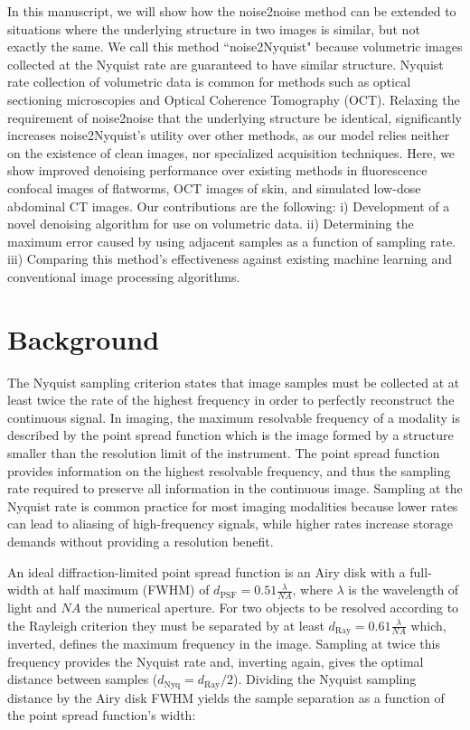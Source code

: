 \documentclass[journal,twoside,web]{ieeecolor}
\begin{document}
In this manuscript, we will show how the noise2noise method can be extended to situations where the underlying structure in two images is similar, but not exactly the same. We call this method ``noise2Nyquist" because volumetric images collected at the Nyquist rate are guaranteed to have similar structure. Nyquist rate collection of volumetric data is common for methods such as optical sectioning microscopies and Optical Coherence Tomography (OCT). Relaxing the requirement of noise2noise that the underlying structure be identical, significantly increases noise2Nyquist's utility over other methods, as our model relies neither on the existence of clean images, nor specialized acquisition techniques. Here, we show improved denoising performance over existing methods in fluorescence confocal images of flatworms, OCT images of skin, and simulated low-dose abdominal CT images. Our contributions are the following: i) Development of a novel denoising algorithm for use on volumetric data. ii) Determining the maximum error caused by using adjacent samples as a function of sampling rate. iii) Comparing this method's effectiveness against existing machine learning and conventional image processing algorithms.

\section{Background}
The Nyquist sampling criterion states that image samples must be collected at at least twice the rate of the highest frequency in order to perfectly reconstruct the continuous signal\cite{Shannon1949}. In imaging, the maximum resolvable frequency of a modality is described by the point spread function which is the image formed by a structure smaller than the resolution limit of the instrument\cite{goodman2005introduction}. The point spread function provides information on the highest resolvable frequency, and thus the sampling rate required to preserve all information in the continuous image. Sampling at the Nyquist rate is common practice for most imaging modalities because lower rates can lead to aliasing of high-frequency signals, while higher rates increase storage demands without providing a resolution benefit. 

An ideal diffraction-limited point spread function is an Airy disk with a full-width at half maximum (FWHM) of $d_{\mbox{PSF}}=0.51\frac{\lambda}{NA}$, where $\lambda$ is the wavelength of light and $NA$ the numerical aperture. For two objects to be resolved according to the Rayleigh criterion they must be separated by at least $d_{\mbox{Ray}}=0.61\frac{\lambda}{NA}$ which, inverted, defines the maximum frequency in the image. Sampling at twice this frequency provides the Nyquist rate and, inverting again, gives the optimal distance between samples ($d_{\mbox{Nyq}} = d_{\mbox{Ray}}/2$). Dividing the Nyquist sampling distance by the Airy disk FWHM yields the sample separation as a function of the point spread function's width:
\end{document}
